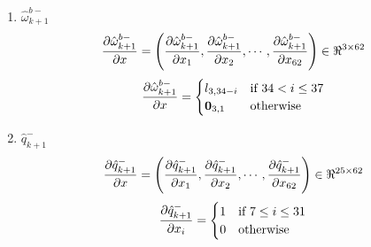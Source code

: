 \begin{enumerate}
\begin{enumerate}
\item $\hat{\omega}^{b-}_{k+1}$
\begin{equation}
    \label{eq:dw_msrdx} 
    \frac{\partial {\hat{\omega}^{b-}_{k+1}}}{\partial {x}} = \left(\frac{\partial {\hat{\omega}^{b-}_{k+1}}}{\partial {x_{1}}}, \frac{\partial {\hat{\omega}^{b-}_{k+1}}}{\partial {x_{2}}}, \cdots , \frac{\partial {\hat{\omega}^{b-}_{k+1}}}{\partial {x_{62}}}\right) \in \Re^{3 \times 62}
\end{equation}
\[ \frac{\partial {\hat{\omega}^{b-}_{k+1}}}{\partial {x}} = 
    \begin{cases}
    l_{3,34-i} & \text{if } 34 < i \leq 37 \\
    \textbf{0}_{3,1} &\text{otherwise}
    \end{cases}
 \]  
 
\item $\hat{q}_{k+1}^-$
\begin{equation}
\label{eq:dq_msrdx}
\frac{\partial {\hat{q}_{k+1}^-}}{\partial {x}} = \left(\frac{\partial {\hat{q}_{k+1}^-}}{\partial {x_{1}}}, \frac{\partial {\hat{q}_{k+1}^-}}{\partial {x_{2}}}, \cdots , \frac{\partial {\hat{q}_{k+1}^-}}{\partial {x_{62}}}\right) \in \Re^{25 \times 62}
\end{equation}
 \[
 \frac{\partial {\hat{q}_{k+1}^-}}{\partial {x_{i}}} =
 \begin{cases}
 1 & \text{if } 7 \leq i \leq 31 \\
 0 & \text{otherwise}
 \end{cases}
 \]


\end{enumerate}
\end{enumerate}
